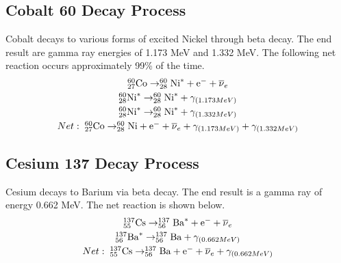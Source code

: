 \documentclass[%
 aip,
rsi,%
 amsmath,amssymb,
 reprint,%
author-numerical,%
]{revtex4-1}
\begin{document}
\subsection{Cobalt 60 Decay Process}
Cobalt decays to various forms of excited Nickel through beta decay. The end result are gamma ray energies of 1.173 MeV and 1.332 MeV. The following net reaction occurs approximately 99\% of the time.
\[\begin{array}{c} { _{27}^ { 60 }\mathrm { Co }  \rightarrow _{28} ^ { 60 }\mathrm { Ni } ^ { * } + \mathrm { e } ^ { - } + \overline { \nu } _ { e } } \vspace{1mm}\\ {_{28}^ { 60 }\mathrm { Ni } ^ { * } \rightarrow _{28}^ { 60 }\mathrm { Ni } ^ { * } + \gamma _ { ( 1.173 M e V ) } }\vspace{1mm}\\ {_{28}^ { 60 }\mathrm { Ni } ^ { * } \rightarrow _{28} ^ { 60 }\mathrm { Ni } ^ { * } + \gamma _ { ( 1.332 M e V ) }} \vspace{1mm}\\ {Net:\hspace{1mm}_{27} ^ { 60 }\mathrm { Co } \rightarrow _ { 28 }^ { 60 }\mathrm { Ni }+ \mathrm { e } ^ { - } + \overline { \nu } _ { e } + \gamma _ { ( 1.173 M e V ) } + \gamma _ { ( 1.332 M e V ) }}\end{array}\]


\subsection{Cesium 137 Decay Process}
Cesium decays to Barium via beta decay. The end result is a gamma ray of energy 0.662 MeV. The net reaction is shown below.
\[\begin{array} { c } { _{55}^ { 137 }\mathrm { Cs } \rightarrow _{56} ^ { 137 }\mathrm { Ba } ^ { *} + \mathrm { e } ^ { - } + \overline { \nu } _ { e } }\vspace{1mm} \\ { _{56} ^ { 137 }\mathrm { Ba } ^ { *} \rightarrow _{56} ^ { 137 }\mathrm { Ba }  + \gamma _ { ( 0.662 M e V ) } } \vspace{1mm}\\ {Net:\hspace{1mm} _{55}^ { 137 }\mathrm { Cs } \rightarrow _{56} ^ { 137 }\mathrm { Ba } + \mathrm { e } ^ { - } + \overline { \nu } _ { e } + \gamma_{( 0.662  MeV  )} } \end{array}\]
\end{document}

